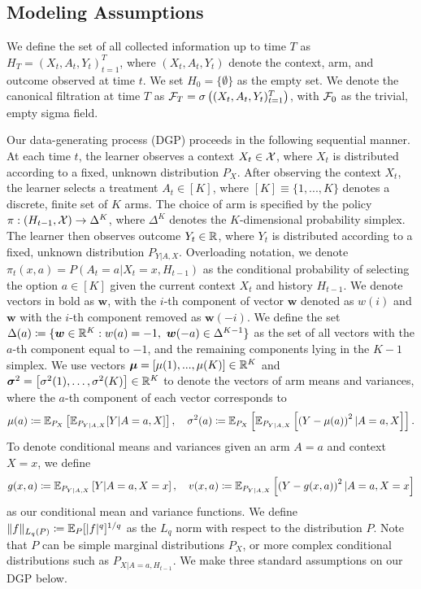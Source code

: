 \documentclass{article}
\begin{document}
\subsection{Modeling Assumptions}


We define the set of all collected information up to time $T$ as $H_T=(X_t, A_t, Y_t)_{t=1}^{T}$, where $(X_t, A_t, Y_t)$ denote the context, arm, and outcome observed at time $t$. We set $H_0 = \{\emptyset\}$ as the empty set. We denote the canonical filtration at time $T$ as $\mathcal{F}_{T} = \sigma\left((X_t, A_t, Y_t)_{t=1}^T\right)$, with $\mathcal{F}_0$ as the trivial, empty sigma field.

Our data-generating process (DGP) proceeds in the following sequential manner.  At each time $t$, the learner observes a context $X_t \in \mathcal{X}$, where $X_t$ is distributed according to a fixed, unknown distribution $P_X$. After observing the context $X_t$, the learner selects a treatment $A_t \in [K]$, where $[K] \equiv \{1,...,K\}$ denotes a discrete, finite set of $K$ arms. The choice of arm is specified by the policy $\pi: (H_{t-1},\mathcal{X}) \rightarrow \Delta^K$, where $\Delta^K$ denotes the $K$-dimensional probability simplex. The learner then observes outcome $Y_t \in \mathbb{R}$, where $Y_t$ is distributed according to a fixed, unknown distribution $P_{Y| A,X}$. Overloading notation, we denote $\pi_t(x, a) = P(A_t = a| X_t=x, H_{t-1} )$ as the conditional probability of selecting the option $a \in [K]$ given the current context $X_t$ and history $H_{t-1}$. We denote vectors in bold as $\bm{w}$, with the $i$-th component of vector $\bm{w}$ denoted as $w(i)$ and $\bm{w}$ with the $i$-th component removed as $\bm{w}(-i)$. We define the set $\Delta(a)\coloneqq \{\boldsymbol{w} \in \mathbb{R}^K: w(a) = -1, \ \boldsymbol{w}(-a) \in \Delta^{K-1}\}$ as the set of all vectors with the $a$-th component equal to $-1$, and the remaining components lying in the $K-1$ simplex. We use vectors $\boldsymbol\mu  = [\mu(1),...,\mu(K)] \in \mathbb{R}^K$ and $\boldsymbol{\sigma}^2 = \left[ \sigma^2(1), \dots, \sigma^2(K) \right] \in \mathbb{R}^K$ to denote the vectors of arm means and variances, where the $a$-th component of each vector corresponds to 
\begin{align*}
    \mu(a) \coloneqq \mathbb{E}_{P_X}\left[\mathbb{E}_{P_{Y|A,X}}[Y|A=a, X] \right], \quad 
    \sigma^2(a) \coloneqq \mathbb{E}_{P_X}\left[\mathbb{E}_{P_{Y|A,X}}\left[ \left(Y - \mu(a)\right)^2 | A=a, X \right]\right].
\end{align*}
To denote conditional means and variances given an arm $A=a$ and context $X=x$, we define
\begin{align*}
    g(x,a) \coloneqq \mathbb{E}_{P_{Y|A,X}}\left[Y|A=a, X=x\right], \quad v(x,a) \coloneqq  \mathbb{E}_{P_{Y|A,X}}\left[\left(Y - g(x,a)\right)^2 | A=a, X=x \right] 
\end{align*}
as our conditional mean and variance functions. We define $\| f\|_{L_q(P)} \coloneqq \mathbb{E}_{P}[|f|^q]^{1/q}$ as the $L_q$ norm with respect to the distribution $P$. Note that $P$ can be simple marginal distributions $P_X$, or more complex conditional distributions such as $P_{X|A=a, H_{t-1}}$. We make three standard assumptions on our DGP below.
\end{document}
